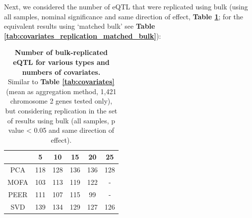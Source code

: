 
Next, we considered the number of eQTL that were replicated using bulk (using all samples, nominal significance and same direction of effect, \textbf{Table \ref{tab:covariates_replication}}; for the equivalent results using `matched bulk' see \textbf{Table \ref{tab:covariates_replication_matched_bulk}}):

\begin{table}[h]
    \centering
    \begin{tabular}{c|c c c c c}
    &         5 & 10 & 15 & 20 & 25  \\
    \hline
    PCA   & 118 & 128 & 136 & 136 & 128 \\
    MOFA  & 103 & 113 & 119 & 122 &  -  \\
    PEER  & 111 & 107 & 115 &  99 &  -  \\
    SVD   & 139 & 134 & 129 & 127 & 126 \\
    \end{tabular}
    \caption[Covariate comparison in terms of replication of bulk results]{\textbf{Number of bulk-replicated eQTL for various types and numbers of covariates.} \\
    Similar to \textbf{Table \ref{tab:covariates}} (mean as aggregation method, 1,421 chromosome 2 genes tested only), but considering replication in the set of results using bulk (all samples, p value < 0.05 and same direction of effect).}
    \label{tab:covariates_replication}
\end{table}

